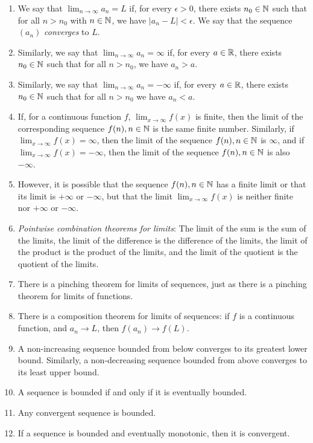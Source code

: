 \documentclass[10pt]{amsart}
\begin{document}
\begin{enumerate}
\item We say that $\lim_{n \to \infty} a_n = L$ if, for every
  $\epsilon > 0$, there exists $n_0 \in \mathbb{N}$ such that for all $n >
  n_0$ with $n \in \mathbb{N}$, we have $|a_n - L| < \epsilon$. We say that
  the sequence $(a_n)$ {\em converges} to $L$.
\item Similarly, we say that $\lim_{n \to \infty} a_n = \infty$ if,
  for every $a \in \mathbb{R}$, there exists $n_0 \in \mathbb{N}$ such that for all $n
  > n_0$, we have $a_n > a$.
\item Similarly, we say that $\lim_{n \to \infty} a_n = -\infty$ if,
  for every $a \in \mathbb{R}$, there exists $n_0 \in \mathbb{N}$ such that for all $n
  > n_0$ we have $a_n < a$.
\item If, for a continuous function $f$, $\lim_{x \to \infty} f(x)$ is
  finite, then the limit of the corresponding sequence $f(n), n \in
  \mathbb{N}$ is the same finite number. Similarly, if $\lim_{x \to \infty}
  f(x) = \infty$, then the limit of the sequence $f(n), n \in \mathbb{N}$ is
  $\infty$, and if $\lim_{x \to \infty} f(x) = -\infty$, then the
  limit of the sequence $f(n), n \in \mathbb{N}$ is also $-\infty$.
\item However, it is possible that the sequence $f(n), n \in \mathbb{N}$ has a
  finite limit or that its limit is $+\infty$ or $-\infty$, but that
  the limit $\lim_{x \to \infty} f(x)$ is neither finite nor $+\infty$
  or $-\infty$.
\item {\em Pointwise combination theorems for limits}: The limit of
  the sum is the sum of the limits, the limit of the difference is the
  difference of the limits, the limit of the product is the product of
  the limits, and the limit of the quotient is the quotient of the
  limits.
\item There is a pinching theorem for limits of sequences, just as
  there is a pinching theorem for limits of functions.
\item There is a composition theorem for limits of sequences: if $f$
  is a continuous function, and $a_n \to L$, then $f(a_n) \to f(L)$.
\item A non-increasing sequence bounded from below converges to its
  greatest lower bound. Similarly, a non-decreasing sequence bounded
  from above converges to its least upper bound.
\item A sequence is bounded if and only if it is eventually bounded.
\item Any convergent sequence is bounded.
\item If a sequence is bounded and eventually monotonic, then it is
  convergent.
\end{enumerate}
\end{document}
